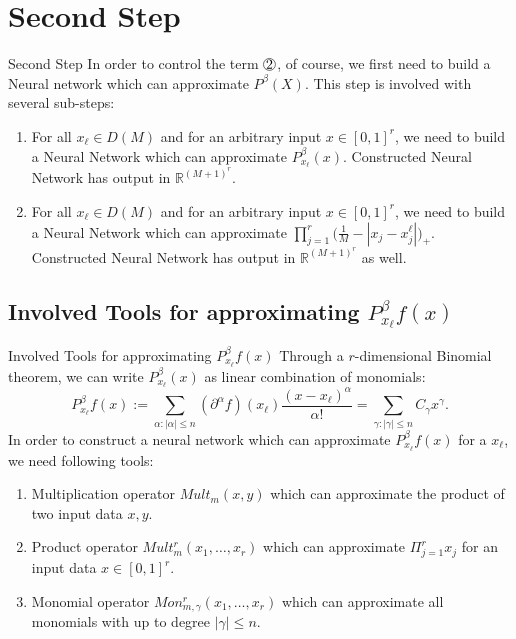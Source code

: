 \documentclass{if-beamer}
\newcommand*\circled[1]{\tikz[baseline=(char.base)]{
            \node[shape=circle,draw,inner sep=0.2pt] (char) {#1};}}
\begin{document}
\section{Second Step}
\begin{frame}{Second Step}
    In order to control the term $\circled{2}$, of course, we first need to build a Neural network which can approximate $P^{\beta}(X)$. This step is involved with several sub-steps:
    \begin{enumerate}
        \item For all $x_{\ell}\in D(M)$ and for an arbitrary input $x\in [0,1]^{r}$, we need to build a Neural Network which can approximate $P^{\beta}_{x_\ell}(x)$. 
        Constructed Neural Network has output in $\mathbb{R}^{(M+1)^{r}}$.
        \item For all $x_{\ell}\in D(M)$ and for an arbitrary input $x\in [0,1]^{r}$, we need to build a Neural Network which can approximate $\prod_{j=1}^{r}\bigg( \frac{1}{M}- |x_{j}-x_{j}^{\ell}| \bigg)_{+}$. 
        Constructed Neural Network has output in $\mathbb{R}^{(M+1)^{r}}$ as well.
    \end{enumerate}
\end{frame}

\subsection{Involved Tools for approximating $P_{x_{\ell}}^{\beta}f(x)$}
\begin{frame}{Involved Tools for approximating $P_{x_{\ell}}^{\beta}f(x)$}
    Through a $r$-dimensional Binomial theorem, we can write $P^{\beta}_{x_{\ell}}(x)$ as linear combination of monomials: 
    \begin{equation*}
        P_{x_{\ell}}^{\beta}f(x):=\sum_{\alpha:|\alpha|\leq n}(\partial^{\alpha}f)(x_{\ell})\frac{(x-x_{\ell})^{\alpha}}{\alpha!}
        = \sum_{\gamma:|\gamma|\leq n} C_{\gamma}x^{\gamma}.
    \end{equation*}
    In order to construct a neural network which can approximate $P_{x_{\ell}}^{\beta}f(x)$ for a $x_{\ell}$, we need following tools:
    \begin{enumerate}
        \item Multiplication operator $Mult_{m}(x,y)$ which can approximate the product of two input data $x,y$.
        \item Product operator $Mult_{m}^{r}(x_{1},\dots,x_{r})$ which can approximate $\Pi_{j=1}^{r}x_{j}$ for an input data $x\in[0,1]^{r}$.
        \item Monomial operator $Mon_{m,\gamma}^{r}(x_{1},\dots,x_{r})$ which can approximate all monomials with up to degree $|\gamma|\leq n$.
    \end{enumerate}
\end{frame}
\end{document}
